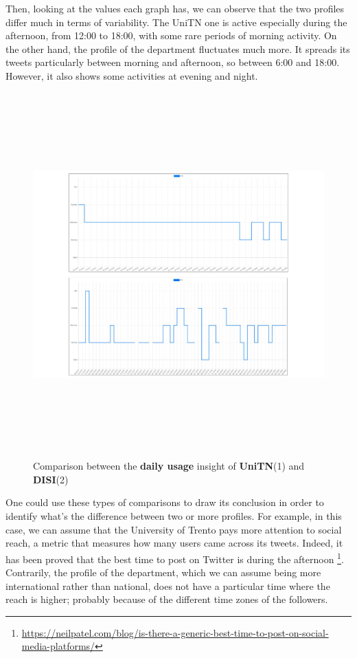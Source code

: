 Then, looking at the values each graph has, we can observe that the two profiles differ much in terms of variability. 
The UniTN one is active especially during the afternoon, from 12:00 to 18:00, with some rare periods of morning activity.
On the other hand, the profile of the department fluctuates much more. It spreads its tweets particularly between morning and afternoon, so between 6:00 and 18:00. However, it also shows some activities at evening and night.

\begin{figure}
    \centering
    \includegraphics[width=%
    1.0\textwidth,height=14cm,keepaspectratio]{img/dailycomparison.pdf}
    \caption{Comparison between the \textbf{daily usage} insight of \textbf{UniTN}(1) and \textbf{DISI}(2)}
    \label{fig:dailyComp}
\end{figure}

One could use these types of comparisons to draw its conclusion in order to identify what's the difference between two or more profiles.
For example, in this case, we can assume that the University of Trento pays more attention to social reach, a metric that measures how many users came across its tweets. Indeed, it has been proved that the best time to post on Twitter is during the afternoon \footnote{\url{https://neilpatel.com/blog/is-there-a-generic-best-time-to-post-on-social-media-platforms/}}.
Contrarily, the profile of the department, which we can assume being more international rather than  national, does not have a particular time where the reach is higher; probably because of the different time zones of the followers.

